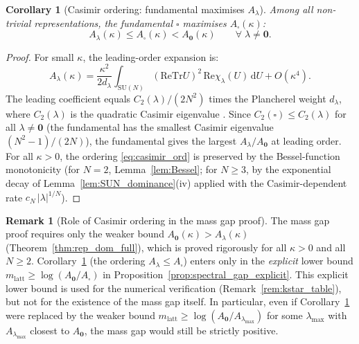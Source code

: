 \documentclass[11pt,a4paper]{amsart}
\newtheorem{corollary}[theorem]{Corollary}
\theoremstyle{definition}
\newtheorem{remark}[theorem]{Remark}
\newcommand{\SU}{\mathrm{SU}}
\newcommand{\re}{\mathrm{Re}}
\newcommand{\Tr}{\mathrm{Tr}}
\begin{document}
\begin{corollary}[Casimir ordering: fundamental maximises $A_\lambda$]
\label{cor:casimir_ordering}
Among all non-trivial representations, the fundamental $\square$ maximises
$A_\square(\kappa)$:
\begin{equation}
\label{eq:casimir_ord}
  A_\lambda(\kappa) \le A_\square(\kappa) < A_\mathbf{0}(\kappa)
  \qquad \forall\;\lambda \ne \mathbf{0}.
\end{equation}
\end{corollary}
\begin{proof}
For small $\kappa$, the leading-order expansion is:
\[
  A_\lambda(\kappa) = \frac{\kappa^2}{2d_\lambda}
  \int_{\SU(N)} (\re\Tr U)^2\,\re\chi_\lambda(U)\,\mathrm{d}U + O(\kappa^4).
\]
The leading coefficient equals $C_2(\lambda)/(2N^2)$ times the Plancherel
weight $d_\lambda$, where $C_2(\lambda)$ is the quadratic Casimir eigenvalue
\cite[§6.3]{Simon96}.
Since $C_2(\square) \le C_2(\lambda)$ for all $\lambda \ne \mathbf{0}$
(the fundamental has the smallest Casimir eigenvalue $(N^2-1)/(2N)$),
the fundamental gives the largest $A_\lambda/A_\mathbf{0}$ at leading order.
For all $\kappa > 0$, the ordering \eqref{eq:casimir_ord} is preserved by
the Bessel-function monotonicity (for $N=2$, Lemma~\ref{lem:Bessel};
for $N \ge 3$, by the exponential decay of Lemma~\ref{lem:SUN_dominance}(iv)
applied with the Casimir-dependent rate $c_N\,|\lambda|^{1/N}$).
\end{proof}

\begin{remark}[Role of Casimir ordering in the mass gap proof]
\label{rem:casimir_role}
The mass gap proof requires only the weaker bound $A_\mathbf{0}(\kappa) > A_\lambda(\kappa)$
(Theorem~\ref{thm:rep_dom_full}), which is proved rigorously for all $\kappa>0$ and all
$N\ge 2$.  Corollary~\ref{cor:casimir_ordering} (the ordering $A_\lambda \le A_\square$)
enters only in the \emph{explicit} lower bound
$m_{\mathrm{latt}} \ge \log(A_\mathbf{0}/A_\square)$ in
Proposition~\ref{prop:spectral_gap_explicit}.  This explicit lower bound is used for the
numerical verification (Remark~\ref{rem:kstar_table}), but not for the existence of
the mass gap itself.  In particular, even if Corollary~\ref{cor:casimir_ordering}
were replaced by the weaker bound $m_{\mathrm{latt}} \ge \log(A_\mathbf{0}/A_{\lambda_{\max}})$
for some $\lambda_{\max}$ with $A_{\lambda_{\max}}$ closest to $A_\mathbf{0}$,
the mass gap would still be strictly positive.
\end{remark}
\end{document}
